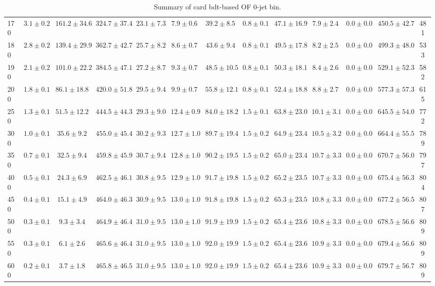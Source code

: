 \begin{table}
{\begin{center}
\begin{tabular}{l | c c | c c c c c c c c  | c c}
170 & $3.1\pm0.2$ & $161.2\pm34.6$ & $324.7\pm37.4$ & $23.1\pm7.3$ & $7.9\pm0.6$ & $39.2\pm8.5$ & $0.8\pm0.1$ & $47.1\pm16.9$ & $7.9\pm2.4$ & $0.0\pm0.0$ & $450.5\pm42.7$ & 481 \\
180 & $2.8\pm0.2$ & $139.4\pm29.9$ & $362.7\pm42.7$ & $25.7\pm8.2$ & $8.6\pm0.7$ & $43.6\pm9.4$ & $0.8\pm0.1$ & $49.5\pm17.8$ & $8.2\pm2.5$ & $0.0\pm0.0$ & $499.3\pm48.0$ & 533 \\
190 & $2.1\pm0.2$ & $101.0\pm22.2$ & $384.5\pm47.1$ & $27.2\pm8.7$ & $9.3\pm0.7$ & $48.5\pm10.5$ & $0.8\pm0.1$ & $50.3\pm18.1$ & $8.4\pm2.6$ & $0.0\pm0.0$ & $529.1\pm52.3$ & 582 \\
200 & $1.8\pm0.1$ & $86.1\pm18.8$ & $420.0\pm51.8$ & $29.5\pm9.4$ & $9.9\pm0.7$ & $55.8\pm12.1$ & $0.8\pm0.1$ & $52.4\pm18.8$ & $8.8\pm2.7$ & $0.0\pm0.0$ & $577.3\pm57.3$ & 615 \\
250 & $1.3\pm0.1$ & $51.5\pm12.2$ & $444.5\pm44.3$ & $29.3\pm9.0$ & $12.4\pm0.9$ & $84.0\pm18.2$ & $1.5\pm0.1$ & $63.8\pm23.0$ & $10.1\pm3.1$ & $0.0\pm0.0$ & $645.5\pm54.0$ & 772 \\
300 & $1.0\pm0.1$ & $35.6\pm9.2$ & $455.0\pm45.4$ & $30.2\pm9.3$ & $12.7\pm1.0$ & $89.7\pm19.4$ & $1.5\pm0.2$ & $64.9\pm23.4$ & $10.5\pm3.2$ & $0.0\pm0.0$ & $664.4\pm55.5$ & 789 \\
350 & $0.7\pm0.1$ & $32.5\pm9.4$ & $459.8\pm45.9$ & $30.7\pm9.4$ & $12.8\pm1.0$ & $90.2\pm19.5$ & $1.5\pm0.2$ & $65.0\pm23.4$ & $10.7\pm3.3$ & $0.0\pm0.0$ & $670.7\pm56.0$ & 797 \\
400 & $0.5\pm0.1$ & $24.3\pm6.9$ & $462.5\pm46.1$ & $30.8\pm9.5$ & $12.9\pm1.0$ & $91.7\pm19.8$ & $1.5\pm0.2$ & $65.2\pm23.5$ & $10.7\pm3.3$ & $0.0\pm0.0$ & $675.4\pm56.3$ & 804 \\
450 & $0.4\pm0.1$ & $15.1\pm4.9$ & $464.0\pm46.3$ & $30.9\pm9.5$ & $13.0\pm1.0$ & $91.8\pm19.8$ & $1.5\pm0.2$ & $65.3\pm23.5$ & $10.8\pm3.3$ & $0.0\pm0.0$ & $677.2\pm56.5$ & 807 \\
500 & $0.3\pm0.1$ & $9.3\pm3.4$ & $464.9\pm46.4$ & $31.0\pm9.5$ & $13.0\pm1.0$ & $91.9\pm19.9$ & $1.5\pm0.2$ & $65.4\pm23.6$ & $10.8\pm3.3$ & $0.0\pm0.0$ & $678.5\pm56.6$ & 809 \\
550 & $0.3\pm0.1$ & $6.1\pm2.6$ & $465.6\pm46.4$ & $31.0\pm9.5$ & $13.0\pm1.0$ & $92.0\pm19.9$ & $1.5\pm0.2$ & $65.4\pm23.6$ & $10.9\pm3.3$ & $0.0\pm0.0$ & $679.4\pm56.6$ & 809 \\
600 & $0.2\pm0.1$ & $3.7\pm1.8$ & $465.8\pm46.5$ & $31.0\pm9.5$ & $13.0\pm1.0$ & $92.0\pm19.9$ & $1.5\pm0.2$ & $65.4\pm23.6$ & $10.9\pm3.3$ & $0.0\pm0.0$ & $679.7\pm56.7$ & 809 \\
\hline
\end{tabular}
\end{center}
}
\caption{Summary of card bdt-based OF 0-jet bin.}
\end{table}
